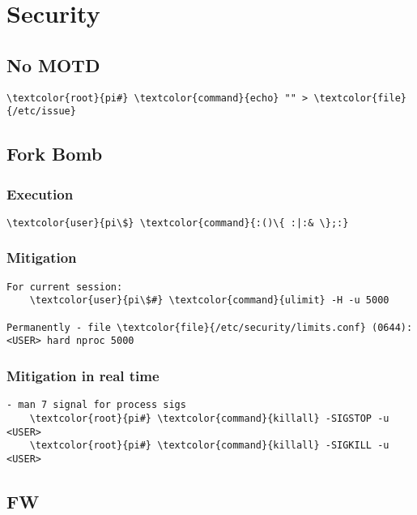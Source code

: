 \documentclass[10pt, a4paper, onecolumn, openany]{book} %
\begin{document}
\chapter{Security}\section{No MOTD}
\begin{Verbatim}[commandchars=\\\{\}]
    \textcolor{root}{pi#} \textcolor{command}{echo} "" > \textcolor{file}{/etc/issue}
\end{Verbatim}

\section{Fork Bomb}
\subsection{Execution}
\begin{Verbatim}[commandchars=\\\{\}]
    \textcolor{user}{pi\$} \textcolor{command}{:()\{ :|:& \};:}
\end{Verbatim}
\subsection{Mitigation}
\begin{Verbatim}[commandchars=\\\{\}]
For current session:
    \textcolor{user}{pi\$#} \textcolor{command}{ulimit} -H -u 5000

Permanently - file \textcolor{file}{/etc/security/limits.conf} (0644):
<USER> hard nproc 5000
\end{Verbatim}
\subsection{Mitigation in real time}
\begin{Verbatim}[commandchars=\\\{\}]
- man 7 signal for process sigs
    \textcolor{root}{pi#} \textcolor{command}{killall} -SIGSTOP -u <USER>
    \textcolor{root}{pi#} \textcolor{command}{killall} -SIGKILL -u <USER>
\end{Verbatim}

\section{FW}
\end{document}
